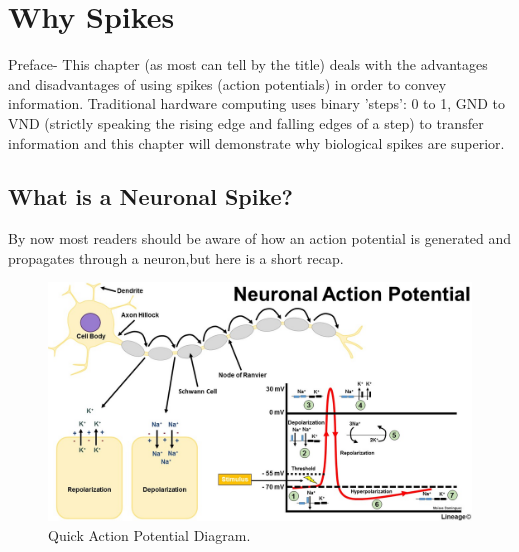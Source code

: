 \documentclass[main]{subfiles}
\begin{document}
\newpage
\section{Why Spikes}

Preface- This chapter (as most can tell by the title) deals with the advantages and disadvantages of using spikes (action potentials) in order to convey information. Traditional hardware computing uses binary 'steps': 0 to 1, GND to VND (strictly speaking the rising edge and falling edges of a step) to transfer information and this chapter will demonstrate why biological spikes are superior.


\subsection{What is a Neuronal Spike?}

By now most readers should be aware of how an action potential is generated and propagates through a neuron,but here is a short recap.

  \begin{figure}[H]
	\centering
	\includegraphics[width=0.9\linewidth]{09_WhySpikes/figures/neuronal action potential.jpg}
	\caption{Quick Action Potential Diagram.}
  \end{figure}
\end{document}
